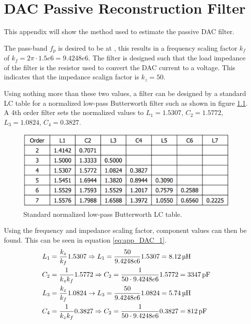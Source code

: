 \chapter{DAC Passive Reconstruction Filter} \label{App:DAC_PASSIVE_FILTER}
This appendix will show the method used to estimate the passive DAC filter. 

The pass-band $f_p$ is desired to be at , this results in a frequency scaling factor $k_f$ of $k_f = 2\pi\cdot1.5e6 = 9.4248e6$. The filter is designed such that the load impedance of the filter is the  resistor used to convert the DAC current to a voltage. This indicates that the impedance scalign factor is $k_z = 50$.

Using nothing more than these two values, a filter can be designed by a standard LC table for a normalized low-pass Butterworth filter such as shown in figure \ref{fig:app_DAC_LC_TABLE}. A 4th order filter sets the normalized values to $L_1 = 1.5307$, $C_2 = 1.5772$, $L_3 = 1.0824$, $C_4 = 0.3827$.

\begin{figure}[H]
    \centering
    \includegraphics[clip, trim=0 0 0 0, width=1\textwidth]{Appendix/Figures/Butterworth_LC.pdf}
    \caption{Standard normalized low-pass Butterworth LC table.}
    \label{fig:app_DAC_LC_TABLE}
\end{figure}

Using the frequency and impedance scaling factor, component values can then be found. This can be seen in equation \ref{eq:app_DAC_1}.
\begin{equation}
\label{eq:app_DAC_1}
\begin{split}
    L_1 &= \frac{k_z}{k_f}1.5307 \Rightarrow L_1 = \frac{50}{9.4248e6}1.5307 = \SIQ{8.12}{\micro\henry}\\
    C_2 &= \frac{1}{k_z k_f}1.5772 \Rightarrow C_2 = \frac{1}{50\cdot9.4248e6}1.5772 = \SIQ{3347}{\pico\farad} \\
    L_3 &= \frac{k_z}{k_f}1.0824 \rightarrow L_3 = \frac{50}{9.4248e6}1.0824 = \SIQ{5.74}{\micro\henry}\\
    C_4 &= \frac{1}{k_z k_f}0.3827 \Rightarrow C_2 = \frac{1}{50\cdot9.4248e6}0.3827 = \SIQ{812}{\pico\farad} \\
\end{split}
\end{equation}

